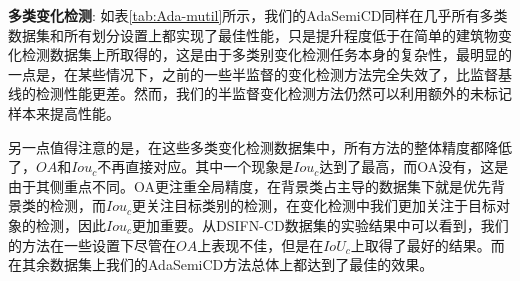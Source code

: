 \documentclass[lang=chs, degree=master, blindreview=false, adobe=false]{yanputhesis}
\begin{document}
\textbf{多类变化检测}:
如表\ref{tab:Ada-mutil}所示，我们的AdaSemiCD同样在几乎所有多类数据集和所有划分设置上都实现了最佳性能，只是提升程度低于在简单的建筑物变化检测数据集上所取得的，这是由于多类别变化检测任务本身的复杂性，最明显的一点是，在某些情况下，之前的一些半监督的变化检测方法完全失效了，比监督基线的检测性能更差。然而，我们的半监督变化检测方法仍然可以利用额外的未标记样本来提高性能。

另一点值得注意的是，在这些多类变化检测数据集中，所有方法的整体精度都降低了，$OA$和$Iou_c$不再直接对应。其中一个现象是$Iou_c$达到了最高，而OA没有，这是由于其侧重点不同。OA更注重全局精度，在背景类占主导的数据集下就是优先背景类的检测，而$Iou_c$更关注目标类别的检测，在变化检测中我们更加关注于目标对象的检测，因此$Iou_c$更加重要。从DSIFN-CD数据集的实验结果中可以看到，我们的方法在一些设置下尽管在$OA$上表现不佳，但是在$IoU_c$上取得了最好的结果。而在其余数据集上我们的AdaSemiCD方法总体上都达到了最佳的效果。
\end{document}
